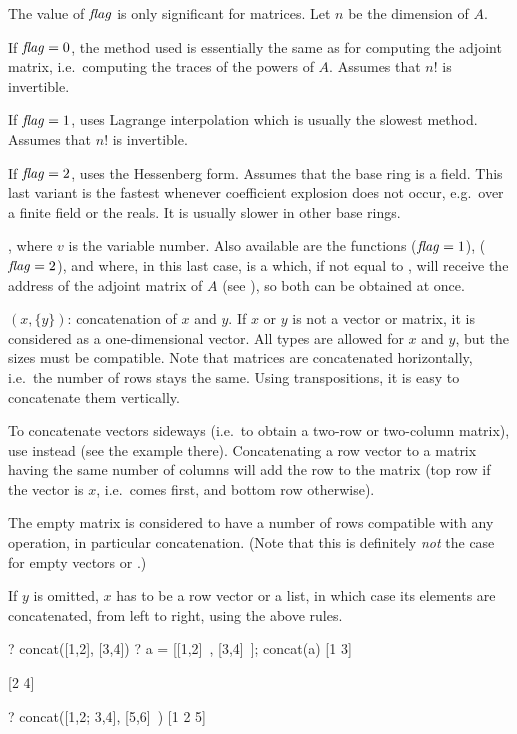 The value of $\hbox{\it f\kern0pt lag\/}$ is only significant for matrices. Let $n$ be the dimension
of $A$.

If $\hbox{\it f\kern0pt lag\/}=0$, the method used is essentially the same as for computing the
adjoint matrix, i.e.~computing the traces of the powers of $A$. Assumes that
$n!$ is invertible.

If $\hbox{\it f\kern0pt lag\/}=1$, uses Lagrange interpolation which is usually the slowest method.
Assumes that $n!$ is invertible.

If $\hbox{\it f\kern0pt lag\/}=2$, uses the Hessenberg form. Assumes that the base ring is a field.
This last variant is the fastest whenever coefficient explosion does not
occur, e.g.~over a finite field or the reals. It is usually slower in other
base rings.

, where $v$ is the variable number. Also available
are the functions  ($\hbox{\it f\kern0pt lag\/}=1$), 
($\hbox{\it f\kern0pt lag\/}=2$), and  where, in this last case,
 is a  which, if not equal to , will receive
the address of the adjoint matrix of $A$ (see ), so both
can be obtained at once.

$(x,\{y\})$: concatenation of $x$ and $y$. If $x$ or $y$ is
not a vector or matrix, it is considered as a one-dimensional vector. All
types are allowed for $x$ and $y$, but the sizes must be compatible. Note
that matrices are concatenated horizontally, i.e.~the number of rows stays
the same. Using transpositions, it is easy to concatenate them vertically.

To concatenate vectors sideways (i.e.~to obtain a two-row or two-column
matrix), use  instead (see the example there). Concatenating a row
vector to a matrix having the same number of columns will add the row to the
matrix (top row if the vector is $x$, i.e.~comes first, and bottom row
otherwise).

The empty matrix \kbd{[;]} is considered to have a number of rows compatible
with any operation, in particular concatenation. (Note that this is
definitely \emph{not} the case for empty vectors \kbd{[~]} or \kbd{[~]\til}.)

If $y$ is omitted, $x$ has to be a row vector or a list, in which case its
elements are concatenated, from left to right, using the above rules.

\bprog
? concat([1,2], [3,4])
? a = [[1,2]~, [3,4]~]; concat(a)
[1 3]

[2 4]

? concat([1,2; 3,4], [5,6]~)
[1 2 5]

